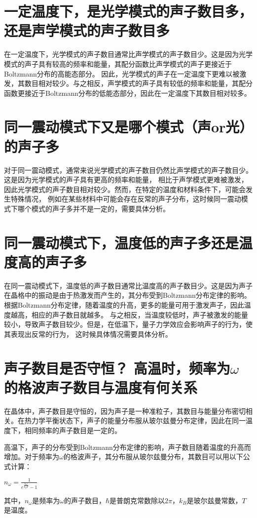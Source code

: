 \documentclass[12pt, a4paper, oneside]{ctexart}
\begin{document}
\begin{spacing}{2.0}
\section{一定温度下，是光学模式的声子数目多，还是声学模式的声子数目多}
在一定温度下，光学模式的声子数目通常比声学模式的声子数目少。这是因为光学模式的声子具有较高的频率和能量，其配分函数比声学模式的声子更接近于Boltzmann分布的高能态部分。
因此，光学模式的声子在一定温度下更难以被激发，其数目相对较少。与之相反，声学模式的声子具有较低的频率和能量，其配分函数更接近于Boltzmann分布的低能态部分，因此在一定温度下其数目相对较多。
\section{同一震动模式下又是哪个模式（声or光）的声子多}
对于同一震动模式，通常来说光学模式的声子数目仍然比声学模式的声子数目少。这是因为光学模式的声子具有更高的频率和能量，
相比于声学模式更难被激发，因此光学模式的声子数目相对较少。然而，在特定的温度和材料条件下，可能会发生特殊情况，
例如在某些材料中可能会存在反常的声子分布，这时候同一震动模式下哪个模式的声子多并不是一定的，需要具体分析。
\section{同一震动模式下，温度低的声子多还是温度高的声子多}
在同一震动模式下，温度低的声子数目通常比温度高的声子数目少。这是因为声子在晶格中的振动是由于热激发而产生的，其分布受到Boltzmann分布定律的影响。
根据Boltzmann分布定律，随着温度的升高，更多的能量可用于激发声子，因此温度越高，相应的声子数目就越多。
与之相反，当温度较低时，声子被激发的能量较小，导致声子数目较少。但是，在低温下，量子力学效应会影响声子的行为，使其表现出反常的行为，
这时候具体情况需要具体分析。
\section{声子数目是否守恒？ 高温时，频率为$\omega$的格波声子数目与温度有何关系}
在晶体中，声子数目是守恒的，因为声子是一种准粒子，其数目与能量分布密切相关。在热力学平衡状态下，声子的能量分布服从玻尔兹曼分布定律，因此在同一温度下，相同频率的声子数目是一定的。

高温下，声子的分布受到Boltzmann分布定律的影响，声子数目随着温度的升高而增加。对于频率为$\omega$的格波声子，其分布服从玻尔兹曼分布，其数目可以用以下公式计算：

$n_\omega = \frac{1}{e^{\frac{\hbar\omega}{k_BT}}-1}$

其中，$n_\omega$是频率为$\omega$的声子数目，$\hbar$是普朗克常数除以$2\pi$，$k_B$是玻尔兹曼常数，$T$是温度。


\end{spacing}
\end{document}
